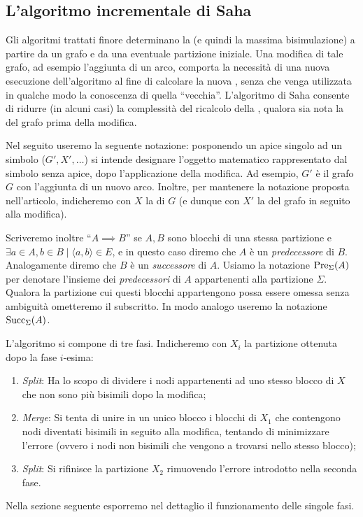 \subsection{L'algoritmo incrementale di Saha}
\label{sec:saha}
Gli algoritmi trattati finore determinano la \rscpnomath (e quindi la massima bisimulazione) a partire da un grafo e da una eventuale partizione iniziale. Una modifica di tale grafo, ad esempio l'aggiunta di un arco, comporta la necessità di una nuova esecuzione dell'algoritmo al fine di calcolare la nuova \rscpnomath, senza che venga utilizzata in qualche modo la conoscenza di quella ``vecchia''. L'algoritmo di Saha \cite{saha} consente di ridurre (in alcuni casi) la complessità del ricalcolo della \rscpnomath, qualora sia nota la \rscpnomath del grafo prima della modifica.

Nel seguito useremo la seguente notazione: posponendo un apice singolo ad un simbolo ($G', X', \dots$) si intende designare l'oggetto matematico rappresentato dal simbolo senza apice, dopo l'applicazione della modifica. Ad esempio, $G'$ è il grafo $G$ con l'aggiunta di un nuovo arco. Inoltre, per mantenere la notazione proposta nell'articolo, indicheremo con $X$ la \rscpnomath di $G$ (e dunque con $X'$ la \rscpnomath del grafo in seguito alla modifica).

Scriveremo inoltre ``$A \implies B$'' se $A,B$ sono blocchi di una stessa partizione e $\exists a \in A, b \in B \mid \langle a, b\rangle \in E$, e in questo caso diremo che $A$ è un \emph{predecessore} di $B$. Analogamente diremo che $B$ è un \emph{successore} di $A$. Usiamo la notazione $\textup{Pre}_{\Sigma}(A)$ per denotare l'insieme dei \emph{predecessori} di $A$ appartenenti alla partizione $\Sigma$. Qualora la partizione cui questi blocchi appartengono possa essere omessa senza ambiguità ometteremo il subscritto. In modo analogo useremo la notazione $\textup{Succ}_{\Sigma}(A)$.

L'algoritmo si compone di tre fasi. Indicheremo con $X_i$ la partizione ottenuta dopo la fase $i$-esima:
\begin{enumerate}
    \item \emph{Split}: Ha lo scopo di dividere i nodi appartenenti ad uno stesso blocco di $X$ che non sono più bisimili dopo la modifica;
    \item \emph{Merge}: Si tenta di unire in un unico blocco i blocchi di $X_1$ che contengono nodi diventati bisimili in seguito alla modifica, tentando di minimizzare l'errore (ovvero i nodi non bisimili che vengono a trovarsi nello stesso blocco);
    \item \emph{Split}: Si rifinisce la partizione $X_2$ rimuovendo l'errore introdotto nella seconda fase.
\end{enumerate}
Nella sezione seguente esporremo nel dettaglio il funzionamento delle singole fasi.

